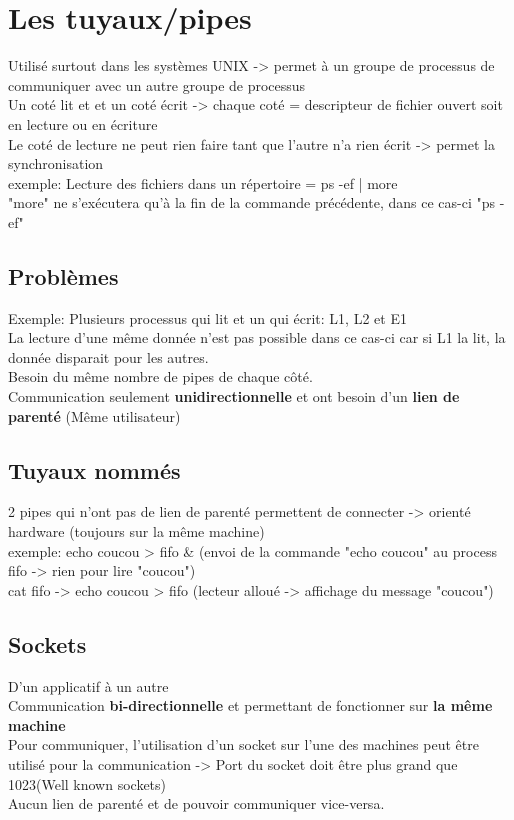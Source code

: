 
\section{Les tuyaux/pipes}
Utilisé surtout dans les systèmes UNIX -> permet à un groupe de processus de communiquer avec un autre groupe de processus\\
Un coté lit et et un coté écrit -> chaque coté = descripteur de fichier ouvert soit en lecture ou en écriture\\
Le coté de lecture ne peut rien faire tant que l'autre n'a rien écrit -> permet la synchronisation\\
exemple: Lecture des fichiers dans un répertoire = ps -ef | more\\
"more" ne s'exécutera qu'à la fin de la commande précédente, dans ce cas-ci "ps -ef"

\subsection{Problèmes}
Exemple: Plusieurs processus qui lit et un qui écrit: L1, L2 et E1\\
La lecture d'une même donnée n'est pas possible dans ce cas-ci car si L1 la lit, la donnée disparait pour les autres.\\
Besoin du même nombre de pipes de chaque côté.\\
Communication seulement \textbf{unidirectionnelle} et ont besoin d'un \textbf{lien de parenté} (Même utilisateur)

\subsection{Tuyaux nommés}
2 pipes qui n'ont pas de lien de parenté permettent de connecter -> orienté hardware (toujours sur la même machine)\\
exemple: echo coucou > fifo & (envoi de la commande "echo coucou" au process fifo -> rien pour lire "coucou")\\
cat fifo -> echo coucou > fifo (lecteur alloué -> affichage du message "coucou")

\subsection{Sockets}
D'un applicatif à un autre\\
Communication \textbf{bi-directionnelle} et permettant de fonctionner sur \textbf{la même machine}\\
Pour communiquer, l'utilisation d'un socket sur l'une des machines peut être utilisé pour la communication -> Port du socket doit être plus grand que 1023(Well known sockets)\\
Aucun lien de parenté et de pouvoir communiquer vice-versa.


